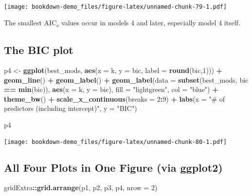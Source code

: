 \documentclass[]{book}
\newenvironment{Shaded}{\begin{snugshade}}{\end{snugshade}}
\newcommand{\KeywordTok}[1]{\textcolor[rgb]{0.13,0.29,0.53}{\textbf{#1}}}
\newcommand{\DataTypeTok}[1]{\textcolor[rgb]{0.13,0.29,0.53}{#1}}
\newcommand{\DecValTok}[1]{\textcolor[rgb]{0.00,0.00,0.81}{#1}}
\newcommand{\StringTok}[1]{\textcolor[rgb]{0.31,0.60,0.02}{#1}}
\newcommand{\OperatorTok}[1]{\textcolor[rgb]{0.81,0.36,0.00}{\textbf{#1}}}
\newcommand{\NormalTok}[1]{#1}
\theoremstyle{definition}
\theoremstyle{definition}
\theoremstyle{definition}
\theoremstyle{remark}
\begin{document}
\texttt{[image: bookdown-demo\_files/figure-latex/unnamed-chunk-79-1.pdf]}

The smallest AIC\textsubscript{c} values occur in models 4 and later,
especially model 4 itself.

\subsection{The BIC plot}\label{the-bic-plot}

\begin{Shaded}
\begin{Highlighting}[]
\NormalTok{p4 <-}\StringTok{ }\KeywordTok{ggplot}\NormalTok{(best_mods, }\KeywordTok{aes}\NormalTok{(}\DataTypeTok{x =}\NormalTok{ k, }\DataTypeTok{y =}\NormalTok{ bic,}
                            \DataTypeTok{label =} \KeywordTok{round}\NormalTok{(bic,}\DecValTok{1}\NormalTok{))) }\OperatorTok{+}
\StringTok{    }\KeywordTok{geom_line}\NormalTok{() }\OperatorTok{+}
\StringTok{    }\KeywordTok{geom_label}\NormalTok{() }\OperatorTok{+}
\StringTok{    }\KeywordTok{geom_label}\NormalTok{(}\DataTypeTok{data =} \KeywordTok{subset}\NormalTok{(best_mods, bic }\OperatorTok{==}\StringTok{ }\KeywordTok{min}\NormalTok{(bic)),}
               \KeywordTok{aes}\NormalTok{(}\DataTypeTok{x =}\NormalTok{ k, }\DataTypeTok{y =}\NormalTok{ bic),}
               \DataTypeTok{fill =} \StringTok{"lightgreen"}\NormalTok{, }\DataTypeTok{col =} \StringTok{"blue"}\NormalTok{) }\OperatorTok{+}
\StringTok{    }\KeywordTok{theme_bw}\NormalTok{() }\OperatorTok{+}
\StringTok{    }\KeywordTok{scale_x_continuous}\NormalTok{(}\DataTypeTok{breaks =} \DecValTok{2}\OperatorTok{:}\DecValTok{9}\NormalTok{) }\OperatorTok{+}
\StringTok{    }\KeywordTok{labs}\NormalTok{(}\DataTypeTok{x =} \StringTok{"# of predictors (including intercept)"}\NormalTok{,}
         \DataTypeTok{y =} \StringTok{"BIC"}\NormalTok{)}

\NormalTok{p4}
\end{Highlighting}
\end{Shaded}

\texttt{[image: bookdown-demo\_files/figure-latex/unnamed-chunk-80-1.pdf]}

\subsection{All Four Plots in One Figure (via
ggplot2)}\label{all-four-plots-in-one-figure-via-ggplot2}

\begin{Shaded}
\begin{Highlighting}[]
\NormalTok{gridExtra}\OperatorTok{::}\KeywordTok{grid.arrange}\NormalTok{(p1, p2, p3, p4, }\DataTypeTok{nrow =} \DecValTok{2}\NormalTok{)}
\end{Highlighting}
\end{Shaded}
\end{document}
